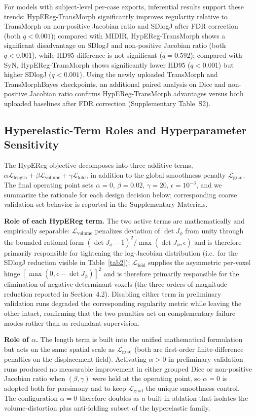 \documentclass[jimaging,article,submit,pdftex,moreauthors]{Definitions/mdpi}
\begin{document}
For models with subject-level per-case exports, inferential results support these trends: HypEReg-TransMorph significantly improves regularity relative to TransMorph on non-positive Jacobian ratio and SDlogJ after FDR correction (both \(q<0.001\)); compared with MIDIR, HypEReg-TransMorph shows a significant disadvantage on SDlogJ and non-positive Jacobian ratio (both \(q<0.001\)), while HD95 difference is not significant (\(q=0.592\)); compared with SyN, HypEReg-TransMorph shows significantly lower HD95 (\(q<0.001\)) but higher SDlogJ (\(q<0.001\)). Using the newly uploaded TransMorph and TransMorphBayes checkpoints, an additional paired analysis on Dice and non-positive Jacobian ratio confirms HypEReg-TransMorph advantages versus both uploaded baselines after FDR correction (Supplementary Table~S2).

\subsection{Hyperelastic-Term Roles and Hyperparameter Sensitivity}\label{sec:hypereg_roles}
The HypEReg objective decomposes into three additive terms, $\alpha\mathcal{L}_{\mathrm{length}}+\beta\mathcal{L}_{\mathrm{volume}}+\gamma\mathcal{L}_{\mathrm{fold}}$, in addition to the global smoothness penalty $\mathcal{L}_{\mathrm{grad}}$. The final operating point sets $\alpha=0$, $\beta=0.02$, $\gamma=20$, $\epsilon=10^{-3}$, and we summarize the rationale for each design decision below; corresponding coarse validation-set behavior is reported in the Supplementary Materials.

\noindent\textbf{Role of each HypEReg term.} The two active terms are mathematically and empirically separable: $\mathcal{L}_{\mathrm{volume}}$ penalizes deviation of $\det J_\phi$ from unity through the bounded rational form $(\det J_\phi-1)^2/\max(\det J_\phi,\epsilon)$ and is therefore primarily responsible for tightening the log-Jacobian distribution (i.e.\ for the SDlogJ reduction visible in Table~\ref{tab2}); $\mathcal{L}_{\mathrm{fold}}$ supplies the asymmetric per-voxel hinge $[\max(0,\epsilon-\det J_\phi)]^2$ and is therefore primarily responsible for the elimination of negative-determinant voxels (the three-orders-of-magnitude reduction reported in Section~4.2). Disabling either term in preliminary validation runs degraded the corresponding regularity metric while leaving the other intact, confirming that the two penalties act on complementary failure modes rather than as redundant supervision.

\noindent\textbf{Role of $\alpha$.} The length term is built into the unified mathematical formulation but acts on the same spatial scale as $\mathcal{L}_{\mathrm{grad}}$ (both are first-order finite-difference penalties on the displacement field). Activating $\alpha>0$ in preliminary validation runs produced no measurable improvement in either grouped Dice or non-positive Jacobian ratio when $(\beta,\gamma)$ were held at the operating point, so $\alpha=0$ is adopted both for parsimony and to keep $\mathcal{L}_{\mathrm{grad}}$ the unique smoothness control. The configuration $\alpha=0$ therefore doubles as a built-in ablation that isolates the volume-distortion plus anti-folding subset of the hyperelastic family.
\end{document}
